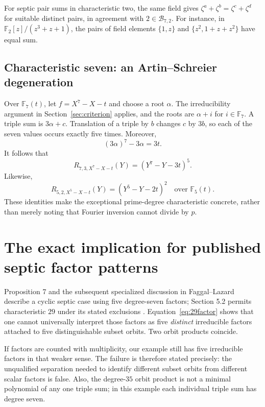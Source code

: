 \documentclass[11pt,a4paper]{article}
\theoremstyle{definition}
\theoremstyle{remark}
\newcommand{\F}{\mathbb F}
\begin{document}
For septic pair sums in characteristic two, the same field gives
$\zeta^a+\zeta^b=\zeta^c+\zeta^d$ for suitable distinct pairs, in agreement
with $2\in\mathcal B_{7,2}$. For instance, in
$\F_2[z]/(z^3+z+1)$, the pairs of field elements $\{1,z\}$ and
$\{z^2,1+z+z^2\}$ have equal sum.

\subsection{Characteristic seven: an Artin--Schreier degeneration}

Over $\F_7(t)$, let $f=X^7-X-t$ and choose a root $\alpha$.
The irreducibility argument in Section~\ref{sec:criterion} applies, and the
roots are $\alpha+i$ for $i\in\F_7$. A triple sum is $3\alpha+c$.
Translation of a triple by $b$ changes $c$ by $3b$, so each of the seven
values occurs exactly five times. Moreover,
\[
 (3\alpha)^7-3\alpha=3t.
\]
It follows that
\begin{equation}
 R_{7,3,X^7-X-t}(Y)=(Y^7-Y-3t)^5.
 \label{eq:char7}
\end{equation}
Likewise,
\begin{equation}
 R_{5,2,X^5-X-t}(Y)=(Y^5-Y-2t)^2
 \quad\text{over }\F_5(t).
 \label{eq:char5}
\end{equation}
These identities make the exceptional prime-degree characteristic
concrete, rather than merely noting that Fourier inversion cannot divide
by $p$.

\section{The exact implication for published septic factor patterns}
\label{sec:published}

Proposition 7 and the subsequent specialized discussion in
Faggal--Lazard describe a cyclic septic case using five degree-seven
factors; Section 5.2 permits characteristic $29$ under its stated
exclusions \cite{FaggalLazard2014}. Equation~\eqref{eq:29factor} shows that
one cannot universally interpret those factors as five \emph{distinct}
irreducible factors attached to five distinguishable subset orbits.
Two orbit products coincide.

If factors are counted with multiplicity, our example still has five
irreducible factors in that weaker sense. The failure is therefore stated
precisely: the unqualified separation needed to identify different subset
orbits from different scalar factors is false. Also, the degree-$35$
orbit product is not a minimal polynomial of any one triple sum; in this
example each individual triple sum has degree seven.
\end{document}
